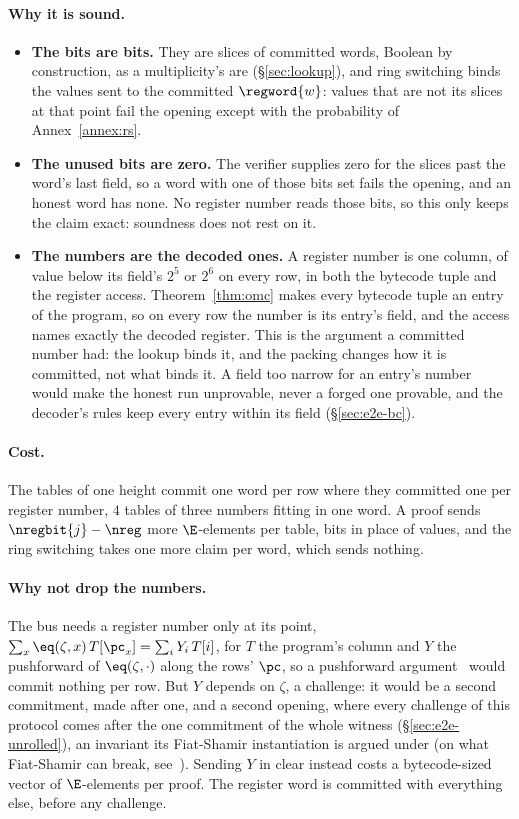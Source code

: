 \paragraph{Why it is sound.}
\begin{itemize}
  \item \textbf{The bits are bits.} They are slices of committed words, Boolean by construction, as a multiplicity's are (\S\ref{sec:lookup}), and ring switching binds the values sent to the committed $\regword{w}$: values that are not its slices at that point fail the opening except with the probability of Annex~\ref{annex:rs}.
  \item \textbf{The unused bits are zero.} The verifier supplies zero for the slices past the word's last field, so a word with one of those bits set fails the opening, and an honest word has none. No register number reads those bits, so this only keeps the claim exact: soundness does not rest on it.
  \item \textbf{The numbers are the decoded ones.} A register number is one column, of value below its field's $2^{5}$ or $2^{6}$ on every row, in both the bytecode tuple and the register access. Theorem~\ref{thm:omc} makes every bytecode tuple an entry of the program, so on every row the number is its entry's field, and the access names exactly the decoded register. This is the argument a committed number had: the lookup binds it, and the packing changes how it is committed, not what binds it. A field too narrow for an entry's number would make the honest run unprovable, never a forged one provable, and the decoder's rules keep every entry within its field (\S\ref{sec:e2e-bc}).
\end{itemize}

\paragraph{Cost.} The tables of one height commit one word per row where they committed one per register number, $4$ tables of three numbers fitting in one word. A proof sends $\nregbit{j}-\nreg$ more $\E$-elements per table, bits in place of values, and the ring switching takes one more claim per word, which sends nothing.

\paragraph{Why not drop the numbers.} The bus needs a register number only at its point, $\sum_x\eq(\zeta,x)\,T[\pc_x]=\sum_iY_i\,T[i]$, for $T$ the program's column and $Y$ the pushforward of $\eq(\zeta,\cdot)$ along the rows' $\pc$, so a pushforward argument~\cite{Sou25} would commit nothing per row. But $Y$ depends on $\zeta$, a challenge: it would be a second commitment, made after one, and a second opening, where every challenge of this protocol comes after the one commitment of the whole witness (\S\ref{sec:e2e-unrolled}), an invariant its Fiat-Shamir instantiation is argued under (on what Fiat-Shamir can break, see~\cite{KRS25}). Sending $Y$ in clear instead costs a bytecode-sized vector of $\E$-elements per proof. The register word is committed with everything else, before any challenge.

